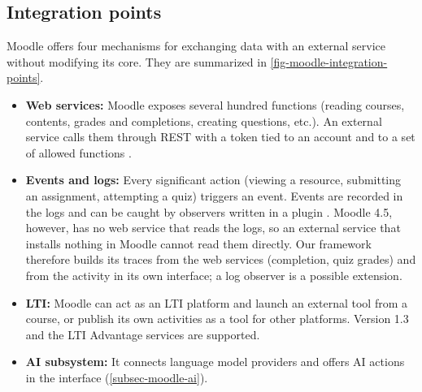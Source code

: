 \subsection{Integration points}
\label{subsec-moodle-integration}

Moodle offers four mechanisms for exchanging data with an external service
without modifying its core. They are summarized in
\cref{fig-moodle-integration-points}.

\begin{itemize}
  \item \textbf{Web services:} Moodle exposes several hundred functions
        (reading courses, contents, grades and completions, creating
        questions, etc.). An external service calls them through REST with
        a token tied to an account and to a set of allowed functions
        \cite{moodle_ws}.
  \item \textbf{Events and logs:} Every significant action (viewing a
        resource, submitting an assignment, attempting a quiz) triggers an
        event. Events are recorded in the logs and can be caught by
        observers written in a plugin \cite{moodle_events}. Moodle 4.5,
        however, has no web service that reads the logs, so an external
        service that installs nothing in Moodle cannot read them directly.
        Our framework therefore builds its traces from the web services
        (completion, quiz grades) and from the activity in its own
        interface; a log observer is a possible extension.
  \item \textbf{LTI:} Moodle can act as an LTI platform and launch an
        external tool from a course, or publish its own activities as a
        tool for other platforms. Version 1.3 and the LTI Advantage
        services are supported.
  \item \textbf{AI subsystem:} It connects language model providers and
        offers AI actions in the interface (\cref{subsec-moodle-ai}).
\end{itemize}

